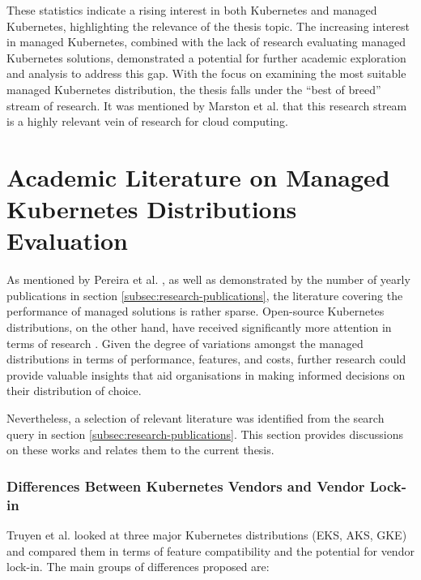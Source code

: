 These statistics indicate a rising interest in both Kubernetes and managed Kubernetes, highlighting the relevance of the thesis topic. The increasing interest in managed Kubernetes, combined with the lack of research evaluating managed Kubernetes solutions, demonstrated a potential for further academic exploration and analysis to address this gap. With the focus on examining the most suitable managed Kubernetes distribution, the thesis falls under the ``best of breed'' stream of research. It was mentioned by Marston et al. \cite{MARSTON2011176} that this research stream is a highly relevant vein of research for cloud computing.

\section{Academic Literature on Managed Kubernetes Distributions Evaluation}

As mentioned by Pereira et al. \cite{pereiraferreiraPerformanceEvaluationContainers2019}, as well as demonstrated by the number of yearly publications in section \ref{subsec:research-publications}, the literature covering the performance of managed solutions is rather sparse. Open-source Kubernetes distributions, on the other hand, have received significantly more attention in terms of research \cite{bohmProfilingLightweightContainer2021,koziolekLightweightKubernetesDistributions2023,ascensaoAssessingKubernetesDistributions2024,9660392,bryantKubernetesDeploymentOptions2024}. Given the degree of variations amongst the managed distributions in terms of performance, features, and costs, further research could provide valuable insights that aid organisations in making informed decisions on their distribution of choice.

Nevertheless, a selection of relevant literature was identified from the search query in section \ref{subsec:research-publications}. This section provides discussions on these works and relates them to the current thesis.

\subsubsection{Differences Between Kubernetes Vendors and Vendor Lock-in}
Truyen et al. \cite{truyenManagingFeatureCompatibility2020} looked at three major Kubernetes distributions (EKS, AKS, GKE) and compared them in terms of feature compatibility and the potential for vendor lock-in. The main groups of differences proposed are:

